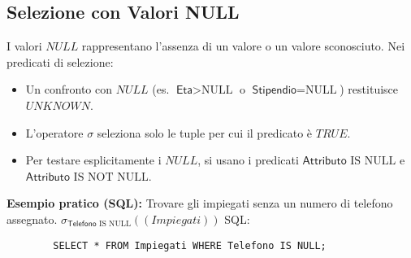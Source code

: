 \documentclass{article}
\newcommand{\Rel}[1]{\textit{#1}} %
\newcommand{\Attr}[1]{\textsf{#1}} %
\newcommand{\myselectop}[2]{\sigma_{#1}(#2)}
\begin{document}
	\subsection{Selezione con Valori NULL}
	I valori $NULL$ rappresentano l'assenza di un valore o un valore sconosciuto.
	Nei predicati di selezione:
	\begin{itemize}
		\item Un confronto con $NULL$ (es. $\Attr{Eta} > \text{NULL}$ o $\Attr{Stipendio} = \text{NULL}$) restituisce $UNKNOWN$.
		\item L'operatore $\sigma$ seleziona solo le tuple per cui il predicato è $TRUE$.
		\item Per testare esplicitamente i $NULL$, si usano i predicati $\Attr{Attributo} \text{ IS NULL}$ e $\Attr{Attributo} \text{ IS NOT NULL}$.
	\end{itemize}
	\textbf{Esempio pratico (SQL):} Trovare gli impiegati senza un numero di telefono assegnato.
	$\myselectop{\Attr{Telefono} \text{ IS NULL}}{(\Rel{Impiegati})}$
	SQL:
	\begin{verbatim}
		SELECT * FROM Impiegati WHERE Telefono IS NULL;
	\end{verbatim}
	
\end{document}
